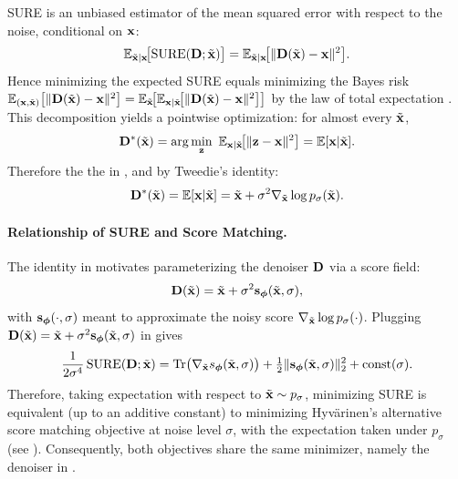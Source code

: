 SURE is an unbiased estimator of the mean squared error with respect to the noise, conditional on ${\mathbf{x}}$:
\[
\mathbb{E}_{\tilde{{\mathbf{x}}}| {\mathbf{x}}}\!\big[\mathrm{SURE}({\mathbf{D}}; \tilde{{\mathbf{x}}})\big]
=
\mathbb{E}_{\tilde{{\mathbf{x}}}| {\mathbf{x}}}\!\big[\|{\mathbf{D}}(\tilde{{\mathbf{x}}})-{\mathbf{x}}\|^2\big].
\]
Hence minimizing the expected SURE equals minimizing the Bayes risk
$\mathbb{E}_{({\mathbf{x}}, \tilde{{\mathbf{x}}})}\big[\|{\mathbf{D}}(\tilde{{\mathbf{x}}})-{\mathbf{x}}\|^2\big]
=\mathbb{E}_{\tilde{{\mathbf{x}}}}\!\big[\mathbb{E}_{{\mathbf{x}}| \tilde{{\mathbf{x}}}}\!\big[\|{\mathbf{D}}(\tilde{{\mathbf{x}}})-{\mathbf{x}}\|^2\big]\big]$ by the law of total expectation . This decomposition yields a pointwise optimization: for almost every $\tilde{{\mathbf{x}}}$,
\[
{\mathbf{D}}^*(\tilde{{\mathbf{x}}})
=\arg\min_{\mathbf z}\ \mathbb{E}_{{\mathbf{x}}| \tilde{{\mathbf{x}}}}\!\big[\|\mathbf z-{\mathbf{x}}\|^2\big]
=\mathbb{E}[{\mathbf{x}}| \tilde{{\mathbf{x}}}].
\]
Therefore the  the  in , and by Tweedie’s identity:
\begin{align}\label{eq:sure-tweedie-denoiser}
    {\mathbf{D}}^*(\tilde{{\mathbf{x}}})=\mathbb{E}[{\mathbf{x}}| \tilde{{\mathbf{x}}}]=\tilde{{\mathbf{x}}}+\sigma^2\nabla_{\tilde{{\mathbf{x}}}}\log p_\sigma(\tilde{{\mathbf{x}}}).
\end{align}




\paragraph{Relationship of SURE and Score Matching.}
The identity in  motivates parameterizing the denoiser ${\mathbf{D}}$ via a score field:
\[
{\mathbf{D}}(\tilde{{\mathbf{x}}})=\tilde{{\mathbf{x}}}+\sigma^2{\mathbf{s}}_{\bm\phi}(\tilde{{\mathbf{x}}}, \sigma),
\]
with ${\mathbf{s}}_{\bm\phi}(\cdot, \sigma)$ meant to approximate the noisy score
$\nabla_{\tilde{{\mathbf{x}}}}\log p_\sigma(\cdot)$.
Plugging  ${\mathbf{D}}(\tilde{{\mathbf{x}}})=\tilde{{\mathbf{x}}}+\sigma^2 {\mathbf{s}}_{\bm\phi}(\tilde{{\mathbf{x}}}, \sigma)$ in  gives
\[
\frac{1}{2\sigma^4}\,\mathrm{SURE}({\mathbf{D}};\tilde{{\mathbf{x}}})
=
\operatorname{Tr}\!\big(\nabla_{\tilde{{\mathbf{x}}}} s_{\bm\phi}(\tilde{{\mathbf{x}}}, \sigma)\big)
+\tfrac12\|{\mathbf{s}}_{\bm\phi}(\tilde{{\mathbf{x}}}, \sigma)\|_2^2
+\text{const}(\sigma).
\]
Therefore, taking expectation with respect to $\tilde{{\mathbf{x}}}\sim p_\sigma$, minimizing SURE is
equivalent (up to an additive constant) to minimizing Hyv\"arinen’s alternative
score matching objective at noise level $\sigma$, with the expectation taken under $p_\sigma$ (see ).
Consequently, both objectives share the same minimizer, namely the denoiser in .



